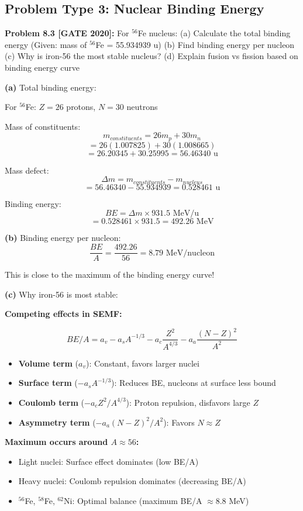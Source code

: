 \documentclass[12pt,a4paper]{article}
\begin{document}
\subsection{Problem Type 3: Nuclear Binding Energy}

\textbf{Problem 8.3 [GATE 2020]:} For $^{56}$Fe nucleus:
(a) Calculate the total binding energy (Given: mass of $^{56}$Fe = 55.934939 u)
(b) Find binding energy per nucleon
(c) Why is iron-56 the most stable nucleus?
(d) Explain fusion vs fission based on binding energy curve

\begin{solution}
\textbf{(a)} Total binding energy:

For $^{56}$Fe: $Z = 26$ protons, $N = 30$ neutrons

Mass of constituents:
$$m_{constituents} = 26m_p + 30m_n$$
$$= 26(1.007825) + 30(1.008665)$$
$$= 26.20345 + 30.25995 = 56.46340\text{ u}$$

Mass defect:
$$\Delta m = m_{constituents} - m_{nucleus}$$
$$= 56.46340 - 55.934939 = 0.528461\text{ u}$$

Binding energy:
$$BE = \Delta m \times 931.5\text{ MeV/u}$$
$$= 0.528461 \times 931.5 = 492.26\text{ MeV}$$

\textbf{(b)} Binding energy per nucleon:
$$\frac{BE}{A} = \frac{492.26}{56} = 8.79\text{ MeV/nucleon}$$

This is close to the maximum of the binding energy curve!

\textbf{(c)} Why iron-56 is most stable:

\textbf{Competing effects in SEMF:}

$$BE/A = a_v - a_s A^{-1/3} - a_c\frac{Z^2}{A^{4/3}} - a_a\frac{(N-Z)^2}{A^2}$$

\begin{itemize}
    \item \textbf{Volume term} ($a_v$): Constant, favors larger nuclei
    \item \textbf{Surface term} ($-a_s A^{-1/3}$): Reduces BE, nucleons at surface less bound
    \item \textbf{Coulomb term} ($-a_c Z^2/A^{4/3}$): Proton repulsion, disfavors large $Z$
    \item \textbf{Asymmetry term} ($-a_a(N-Z)^2/A^2$): Favors $N \approx Z$
\end{itemize}

\textbf{Maximum occurs around $A \approx 56$:}
\begin{itemize}
    \item Light nuclei: Surface effect dominates (low BE/A)
    \item Heavy nuclei: Coulomb repulsion dominates (decreasing BE/A)
    \item $^{56}$Fe, $^{58}$Fe, $^{62}$Ni: Optimal balance (maximum BE/A $\approx 8.8$ MeV)
\end{itemize}


\end{solution}
\end{document}
